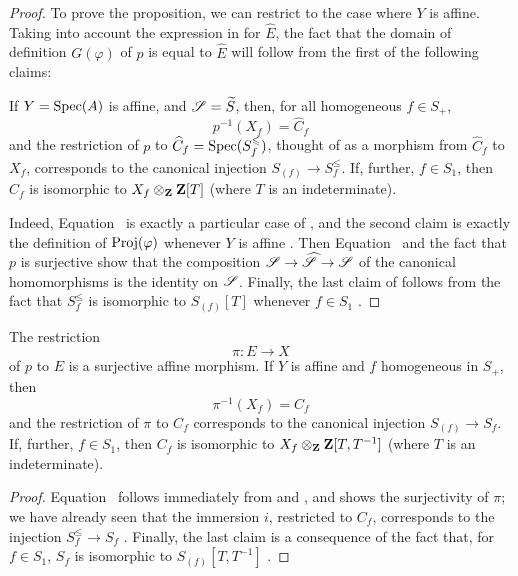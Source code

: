 \begin{proof}
To prove the proposition, we can restrict to the case where $Y$ is affine.
Taking into account the expression in  for $\widehat{E}$, the fact that the domain of definition $G(\varphi)$ of $p$ is equal to $\widehat{E}$ will follow from the first of the following claims:
\begin{env}[8.3.5.3]
\label{II.8.3.5.3}
If $Y=\operatorname{Spec}(A)$ is affine, and $\mathscr{S}=\widetilde{S}$, then, for all homogeneous $f\in S_+$,
\[
\label{II.8.3.5.4}
  p^{-1}(X_f) = \widehat{C}_f
\tag{8.3.5.4}
\]
and the restriction of $p$ to $\widehat{C}_f=\operatorname{Spec}(S_f^\leqslant)$, thought of as a morphism from $\widehat{C}_f$ to $X_f$, corresponds to the canonical injection $S_{(f)}\to S_f^\leq$.
If, further, $f\in S_1$, then $\widehat{C}_f$ is isomorphic to $X_f\otimes_{\mathbf{Z}}\mathbf{Z}[T]$ (where $T$ is an indeterminate).
\end{env}

Indeed, Equation~ is exactly a particular case of , and the second claim is exactly the definition of $\operatorname{Proj}(\varphi)$ whenever $Y$ is affine .
Then Equation~ and the fact that $p$ is surjective show that the composition $\sh{S}\to\widehat{\sh{S}}\to\sh{S}$ of the canonical homomorphisms is the identity on $\mathscr{S}$.
Finally, the last claim of  follows from the fact that $S_f^\leq$ is isomorphic to $S_{(f)}[T]$ whenever $f\in S_1$ .
\end{proof}

\begin{corollary}[8.3.6]
\label{II.8.3.6}
The restriction
\[
\label{II.8.3.6.1}
  \pi: E \to X
\tag{8.3.6.1}
\]
of $p$ to $E$ is a surjective affine morphism.
If $Y$ is affine and $f$ homogeneous in $S_+$, then
\[
\label{II.8.3.6.2}
  \pi^{-1}(X_f) = C_f
\tag{8.3.6.2}
\]
and the restriction of $\pi$ to $C_f$ corresponds to the canonical injection $S_{(f)}\to S_f$.
If, further, $f\in S_1$, then $C_f$ is isomorphic to $X_f\otimes_{\mathbf{Z}}\mathbf{Z}[T,T^{-1}]$ (where $T$ is an indeterminate).
\end{corollary}

\begin{proof}
Equation~ follows immediately from  and , and shows the surjectivity of $\pi$;
we have already seen that the immersion $i$, restricted to $C_f$, corresponds
to the injection $S_f^\leq\to S_f$ .
Finally, the last claim is a consequence of the fact that, for $f\in S_1$, $S_f$ is isomorphic to $S_{(f)}[T,T^{-1}]$ .
\end{proof}

